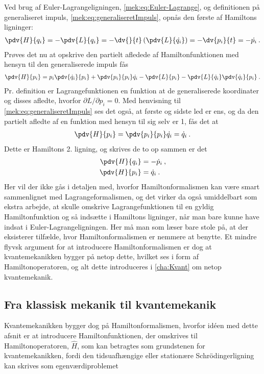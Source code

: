 Ved brug af Euler-Lagrangeligningen, \cref{mek:eq:Euler-Lagrange}, og definitionen på generaliseret impuls, \cref{mek:eq:generaliseretImpuls}, opnås den første af Hamiltons ligninger:
%
\begin{align}
	\pdv{H}{q_i} = -\pdv{L}{q_i} = -\dv{}{t}\left(\pdv{L}{\dot{q_i}}\right) = -\dv{p_i}{t} = -\dot{p_i} \: .
\end{align}
%
Prøves det nu at opskrive den partielt afledede af Hamiltonfunktionen med hensyn til den generaliserede impuls fås
%
\begin{align}
	\pdv{H}{p_i} = p_i\pdv{\dot{q}_i}{p_i} + \pdv{p_i}{p_i}\dot{q_i} - \pdv{L}{p_i} - \pdv{L}{\dot{q}_i}\pdv{\dot{q}_i}{p_i} \: .
\end{align}
%
Pr. definition er Lagrangefunktionen en funktion at de generaliserede koordinater og disses afledte, hvorfor $\partial L/\partial p_i = 0$. Med henvisning til \cref{mek:eq:generaliseretImpuls} ses det også, at første og sidste led er ens, og da den partielt afledte af en funktion med hensyn til sig selv er 1, fås det at
%
\begin{align}
	\pdv{H}{p_i} = \pdv{p_i}{p_i}\dot{q_i} =  \dot{q}_i \: .
\end{align}
%
Dette er Hamiltons 2. ligning, og skrives de to op sammen er det
%
\begin{equation}
\begin{aligned}
	\pdv{H}{q_i} &=  -\dot{p}_i \: , \\
	\pdv{H}{p_i} &=  \dot{q}_i \: .
\end{aligned}
\end{equation}
%
Her vil der ikke gås i detaljen med, hvorfor Hamiltonformalismen kan være smart sammenlignet med Lagrangeformalismen, og det virker da også umiddelbart som ekstra arbejde, at skulle omskrive Lagrangefunktionen til en gyldig Hamiltonfunktion og så indsætte i Hamiltons ligninger, når man bare kunne have indsat i Euler-Lagrangeligningen. Her må man som læser bare stole på, at der eksisterer tilfælde, hvor Hamiltonformalismen er nemmere at benytte. Et mindre flyvsk argument for at introducere Hamiltonformalismen er dog at kvantemekanikken bygger på netop dette, hvilket ses i form af Hamiltonoperatoren, og alt dette introduceres i \cref{cha:Kvant} om netop kvantemekanik.


\subsection{Fra klassisk mekanik til kvantemekanik}
Kvantemekanikken bygger dog på Hamiltonformalismen, hvorfor idéen med dette afsnit er at introducere Hamiltonfunktionen, der omskrives til Hamiltonoperatoren, $\hat{H}$, som kan betragtes som grundstenen for kvantemekanikken, fordi den tidsuafhængige eller stationære Schrödingerligning kan skrives som egenværdiproblemet

